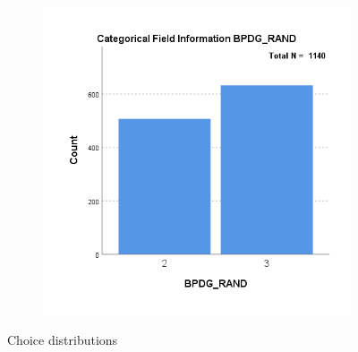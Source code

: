 \documentclass{UoYCSproject}
\begin{document}
\begin{figure}[htb]
\begin{subfigure}[b]{0.45\textwidth}
    \end{subfigure}
    ~
    \begin{subfigure}[b]{0.45\textwidth}
      \centering
      \includegraphics[width=\textwidth]{ExternalValidation/cat_info_bpdg_rand.png}
    \end{subfigure}
    \caption{Choice distributions}
    \label{fig:choice_distr}
  \end{figure}


\printbibliography
\end{document}
